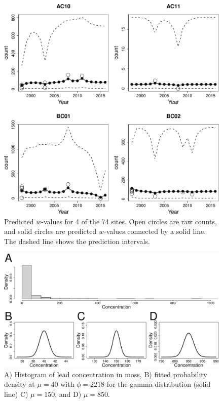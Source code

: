 \documentclass[12pt, titlepage]{article}
\begin{document}
\begin{figure}[H]
  \begin{center}
	    \includegraphics[width=.95\linewidth]{figures/seals_predw}
  \end{center}
  \caption{Predicted $w$-values for 4 of the 74 sites.  Open circles are raw counts, and solid circles are predicted $w$-values connected by a solid line.  The dashed line shows the prediction intervals.  \label{Fig:seals_predw}}
\end{figure}

\begin{figure}[H]
  \begin{center}
	    \includegraphics[width=.95\linewidth]{figures/moss_densities}
  \end{center}
  \caption{A) Histogram of lead concentration in moss, B) fitted probability density at $\mu = 40$ with $\phi = 2218$ for the gamma distribution (solid line) C) $\mu = 150$, and D) $\mu = 850$. \label{Fig:moss_densities}}
\end{figure}
\end{document}
